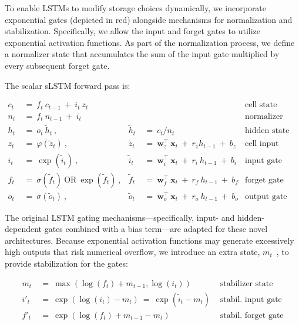 To enable LSTMs to modify storage choices dynamically, we incorporate exponential gates (depicted in red) alongside mechanisms for normalization and stabilization. Specifically, we allow the input and forget gates to utilize exponential activation functions. As part of the normalization process, we define a normalizer state that accumulates the sum of the input gate multiplied by every subsequent forget gate.

The scalar sLSTM forward pass is:

\begin{align}
\label{eq:slstmforward}
c_t \ &= \  f_t \ c_{t-1} \ + \ i_t \ z_t & &
 &\text{cell state} \\
n_t \ &= \  f_t \ n_{t-1} \ + \ i_t  & &
 &\text{normalizer state} \\
h_t \ &= \ o_t \ \tilde{h}_t \ ,
  &\tilde{h}_t \ &= \ c_t / n_t
&\text{hidden state} \\
z_t \ &= \ \varphi \left( \tilde{z}_t \right) \ , 
  &\tilde{z}_t \ &=  \ \mathbf{w}^\top_{z} \ \mathbf{x}_t \ + \
  r_{z}  h_{t-1} \ + \  b_{z}
  &\text{cell input} \\
i_t \ &= \ \!\exp \left( \tilde{i}_t  \right) \ , 
  &\tilde{i}_t \ &= \ \mathbf{w}^\top_{i} \ \mathbf{x}_t \ + \
  r_{i}  \ h_{t-1} \ + \  b_{i}
  &\text{input gate} \\
f_t \ &= \ \sigma \left(  \tilde{f}_t \right) \ \text{OR} \
\!\exp \left(  \tilde{f}_t \right) \ ,
  &\tilde{f}_t \ &= \ \mathbf{w}^\top_{f} \ \mathbf{x}_t  \ + \
  r_{f}  \ h_{t-1} \ + \  b_{f}
  &\text{forget gate} \\
o_t \ &= \ \sigma \left( \tilde{o}_t \right) \ , 
  &\tilde{o}_t  \ &= \ \mathbf{w}^\top_{o} \ \mathbf{x}_t \ + \
  r_{o}  \ h_{t-1} \ + \  b_{o}
  &\text{output gate}
\end{align}

The original LSTM gating mechanisms—specifically, input- and hidden-dependent gates combined with a bias term—are adapted for these novel architectures. Because exponential activation functions may generate excessively high outputs that risk numerical overflow, we introduce an extra state, \mbox{$m_t$~\citep{Milakov:18arxiv}}, to provide stabilization for the gates:

\begin{align}
\label{eq:slstmstabil}
m_t \ &= \ \max \left( \log ( f_t ) + m_{t-1} , \log ( i_t ) \right) &\text{stabilizer state} \\
i'_t \ &= \ \exp \left( \log \left( i_t \right) - m_t \right) \ = \ \exp \left( \tilde{i}_t - m_t \right) \ \, 
  &\text{stabil. input gate} \\
f'_t \ &= \ \exp \left( \log \left( f_t \right) + m_{t-1} - m_t \right) \ \, 
  &\text{stabil. forget gate}
\end{align}

